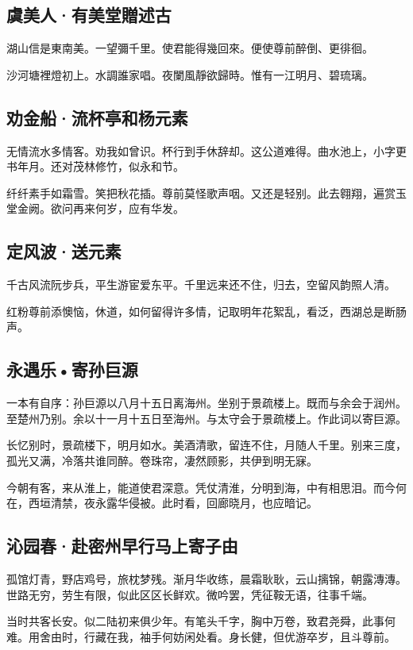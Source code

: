 \documentclass[a5paper]{ctexart}
\begin{document}
	
	\subsection{虞美人·有美堂贈述古}
	湖山信是東南美。一望彌千里。使君能得幾回來。便使尊前醉倒、更徘徊。
	
	沙河塘裡燈初上。水調誰家唱。夜闌風靜欲歸時。惟有一江明月、碧琉璃。
	
	\subsection{劝金船·流杯亭和杨元素}
	无情流水多情客。劝我如曾识。杯行到手休辞却。这公道难得。曲水池上，小字更书年月。还对茂林修竹，似永和节。　
	
	纤纤素手如霜雪。笑把秋花插。尊前莫怪歌声咽。又还是轻别。此去翱翔，遍赏玉堂金阙。欲问再来何岁，应有华发。　
	
	\subsection{定风波·送元素}
	千古风流阮步兵，平生游宦爱东平。千里远来还不住，归去，空留风韵照人清。
	
	红粉尊前添懊恼，休道，如何留得许多情，记取明年花絮乱，看泛，西湖总是断肠声。
	
	\subsection{永遇乐•寄孙巨源}
	\begin{small}
		一本有自序：孙巨源以八月十五日离海州。坐别于景疏楼上。既而与余会于润州。至楚州乃别。余以十一月十五日至海州。与太守会于景疏楼上。作此词以寄巨源。　
	\end{small}
	
	长忆别时，景疏楼下，明月如水。美酒清歌，留连不住，月随人千里。别来三度，孤光又满，冷落共谁同醉。卷珠帘，凄然顾影，共伊到明无寐。
	
	今朝有客，来从淮上，能道使君深意。凭仗清淮，分明到海，中有相思泪。而今何在，西垣清禁，夜永露华侵被。此时看，回廊晓月，也应暗记。
	
	\subsection{沁园春·赴密州早行马上寄子由}
	孤馆灯青，野店鸡号，旅枕梦残。渐月华收练，晨霜耿耿，云山摛锦，朝露漙漙。世路无穷，劳生有限，似此区区长鲜欢。微吟罢，凭征鞍无语，往事千端。
	
	当时共客长安。似二陆初来俱少年。有笔头千字，胸中万卷，致君尧舜，此事何难。用舍由时，行藏在我，袖手何妨闲处看。身长健，但优游卒岁，且斗尊前。
	
\end{document}
